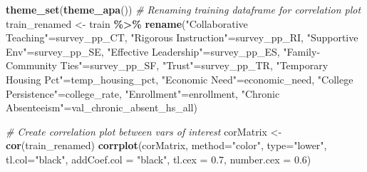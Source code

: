 \documentclass[
  man,floatsintext]{apa6}
\newenvironment{Shaded}{\begin{snugshade}}{\end{snugshade}}
\newcommand{\AttributeTok}[1]{\textcolor[rgb]{0.13,0.29,0.53}{#1}}
\newcommand{\CommentTok}[1]{\textcolor[rgb]{0.56,0.35,0.01}{\textit{#1}}}
\newcommand{\FloatTok}[1]{\textcolor[rgb]{0.00,0.00,0.81}{#1}}
\newcommand{\FunctionTok}[1]{\textcolor[rgb]{0.13,0.29,0.53}{\textbf{#1}}}
\newcommand{\NormalTok}[1]{#1}
\newcommand{\OtherTok}[1]{\textcolor[rgb]{0.56,0.35,0.01}{#1}}
\newcommand{\SpecialCharTok}[1]{\textcolor[rgb]{0.81,0.36,0.00}{\textbf{#1}}}
\newcommand{\StringTok}[1]{\textcolor[rgb]{0.31,0.60,0.02}{#1}}
\begin{document}
\begin{Shaded}
\begin{Highlighting}[]
\FunctionTok{theme\_set}\NormalTok{(}\FunctionTok{theme\_apa}\NormalTok{())}
\CommentTok{\# Renaming training dataframe for correlation plot}
\NormalTok{train\_renamed }\OtherTok{\textless{}{-}}\NormalTok{ train }\SpecialCharTok{\%\textgreater{}\%}
  \FunctionTok{rename}\NormalTok{(}\StringTok{"Collaborative Teaching"}\OtherTok{=}\NormalTok{survey\_pp\_CT,}
         \StringTok{"Rigorous Instruction"}\OtherTok{=}\NormalTok{survey\_pp\_RI,}
         \StringTok{"Supportive Env"}\OtherTok{=}\NormalTok{survey\_pp\_SE,}
         \StringTok{"Effective Leadership"}\OtherTok{=}\NormalTok{survey\_pp\_ES,}
         \StringTok{"Family{-}Community Ties"}\OtherTok{=}\NormalTok{survey\_pp\_SF,}
         \StringTok{"Trust"}\OtherTok{=}\NormalTok{survey\_pp\_TR,}
         \StringTok{"Temporary Housing Pct"}\OtherTok{=}\NormalTok{temp\_housing\_pct,}
         \StringTok{"Economic Need"}\OtherTok{=}\NormalTok{economic\_need,}
         \StringTok{"College Persistence"}\OtherTok{=}\NormalTok{college\_rate,}
         \StringTok{"Enrollment"}\OtherTok{=}\NormalTok{enrollment,}
         \StringTok{"Chronic Absenteeism"}\OtherTok{=}\NormalTok{val\_chronic\_absent\_hs\_all)}

\CommentTok{\# Create correlation plot between vars of interest}
\NormalTok{corMatrix }\OtherTok{\textless{}{-}} \FunctionTok{cor}\NormalTok{(train\_renamed)}
\FunctionTok{corrplot}\NormalTok{(corMatrix, }\AttributeTok{method=}\StringTok{"color"}\NormalTok{, }\AttributeTok{type=}\StringTok{"lower"}\NormalTok{, }\AttributeTok{tl.col=}\StringTok{"black"}\NormalTok{, }\AttributeTok{addCoef.col =} \StringTok{"black"}\NormalTok{, }\AttributeTok{tl.cex =} \FloatTok{0.7}\NormalTok{, }\AttributeTok{number.cex =} \FloatTok{0.6}\NormalTok{)}


\end{Highlighting}
\end{Shaded}
\end{document}
